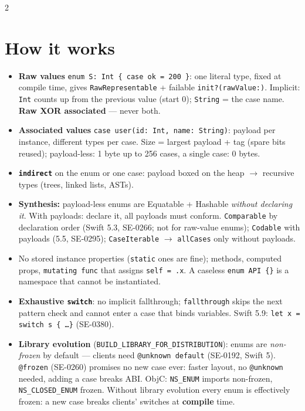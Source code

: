 \documentclass[8pt]{extarticle}
\begin{document}
\begin{multicols}{2}
\raggedright

\section{How it works}
\begin{itemize}
  \item \textbf{Raw values} \texttt{enum S: Int \{ case ok = 200 \}}: one literal type, fixed at
        compile time, gives \texttt{RawRepresentable} + failable \texttt{init?(rawValue:)}.
        Implicit: \texttt{Int} counts up from the previous value (start 0);
        \texttt{String} = the case name. \textbf{Raw XOR associated} — never both.
  \item \textbf{Associated values} \texttt{case user(id: Int, name: String)}: payload per
        instance, different types per case. Size = largest payload + tag (spare bits
        reused); payload-less: 1 byte up to 256 cases, a single case: 0 bytes.
  \item \textbf{\texttt{indirect}} on the enum or one case: payload boxed on the heap $\to$
        recursive types (trees, linked lists, ASTs).
  \item \textbf{Synthesis:} payload-less enums are Equatable + Hashable \emph{without
        declaring it}. With payloads: declare it, all payloads must conform.
        \texttt{Comparable} by declaration order (Swift 5.3, SE-0266; not for raw-value
        enums); \texttt{Codable} with payloads (5.5, SE-0295);
        \texttt{CaseIterable} $\to$ \texttt{allCases} only without payloads.
  \item No stored instance properties (\texttt{static} ones are fine); methods,
        computed props, \texttt{mutating func} that assigns \texttt{self = .x}. A caseless
        \texttt{enum API \{\}} is a namespace that cannot be instantiated.
  \item \textbf{Exhaustive \texttt{switch}}: no implicit fallthrough; \texttt{fallthrough}
        skips the next pattern check and cannot enter a case that binds variables.
        Swift 5.9: \texttt{let x = switch s \{ \ldots \}} (SE-0380).
  \item \textbf{Library evolution} (\texttt{BUILD\_LIBRARY\_FOR\_DISTRIBUTION}):
        enums are \emph{non-frozen} by default — clients need \texttt{@unknown default}
        (SE-0192, Swift 5). \texttt{@frozen} (SE-0260) promises no new case ever: faster
        layout, no \texttt{@unknown} needed, adding a case breaks ABI. ObjC:
        \texttt{NS\_ENUM} imports non-frozen, \texttt{NS\_CLOSED\_ENUM} frozen. Without
        library evolution every enum is effectively frozen: a new case breaks
        clients' switches at \textbf{compile} time.
\end{itemize}


\end{multicols}
\end{document}

